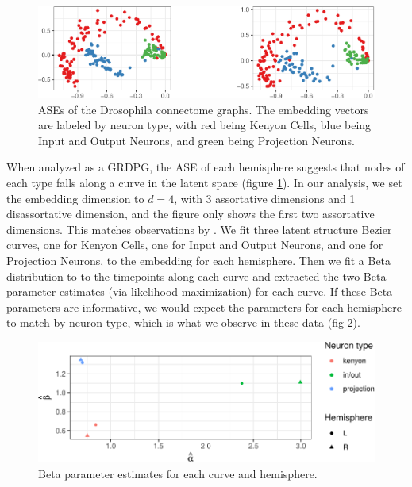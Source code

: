 \documentclass[12pt]{article}
\begin{document}
\begin{figure}[H]

{\centering \includegraphics{draft_files/figure-latex/mbconnectome-ase-1} 

}

\caption{ASEs of the Drosophila connectome graphs. The embedding vectors are labeled by neuron type, with red being Kenyon Cells, blue being Input and Output Neurons, and green being Projection Neurons.}\label{fig:mbconnectome-ase}
\end{figure}

When analyzed as a GRDPG, the ASE of each hemisphere suggests that nodes
of each type falls along a curve in the latent space (figure
\ref{fig:mbconnectome-ase}). In our analysis, we set the embedding
dimension to \(d = 4\), with 3 assortative dimensions and 1
disassortative dimension, and the figure only shows the first two
assortative dimensions. This matches observations by
\citet{athreya2020estimation}. We fit three latent structure Bezier
curves, one for Kenyon Cells, one for Input and Output Neurons, and one
for Projection Neurons, to the embedding for each hemisphere. Then we
fit a Beta distribution to to the timepoints along each curve and
extracted the two Beta parameter estimates (via likelihood maximization)
for each curve. If these Beta parameters are informative, we would
expect the parameters for each hemisphere to match by neuron type, which
is what we observe in these data (fig \ref{fig:mbconnectome-beta}).

\begin{figure}[H]

{\centering \includegraphics{draft_files/figure-latex/mbconnectome-beta-1} 

}

\caption{Beta parameter estimates for each curve and hemisphere.}\label{fig:mbconnectome-beta}
\end{figure}
\end{document}
